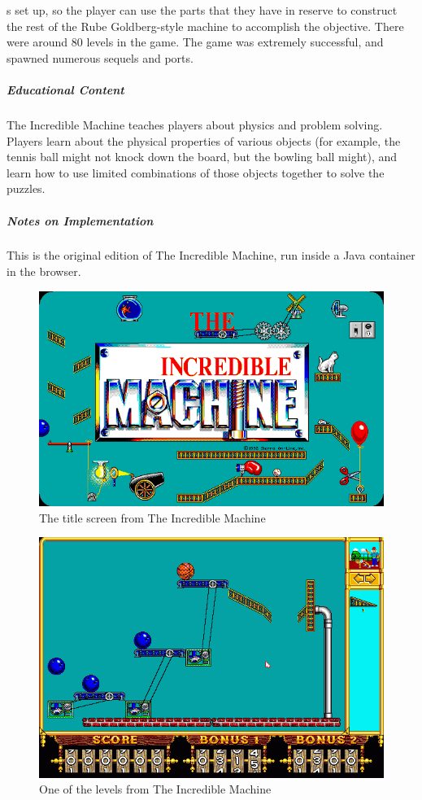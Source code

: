 s set up, so the player can use the parts that they have in reserve to construct the rest of the Rube Goldberg-style machine to accomplish the objective. There were around 80 levels in the game. The game was extremely successful, and spawned numerous sequels and ports.\subparagraph{Educational Content}The Incredible Machine teaches players about physics and problem solving. Players learn about the physical properties of various objects (for example, the tennis ball might not knock down the board, but the bowling ball might), and learn how to use limited combinations of those objects together to solve the puzzles. \subparagraph{Notes on Implementation}This is the original edition of The Incredible Machine, run inside a Java container in the browser.\newpage\begin{figure}[h!]\centering \includegraphics[height=0.33\textheight]{img/machine_title.png}\caption{The title screen from The Incredible Machine}\end{figure}\begin{figure}[h!]\centering \includegraphics[height=0.33\textheight]{img/machine_screen.png}\caption{One of the levels from The Incredible Machine}\end{figure}